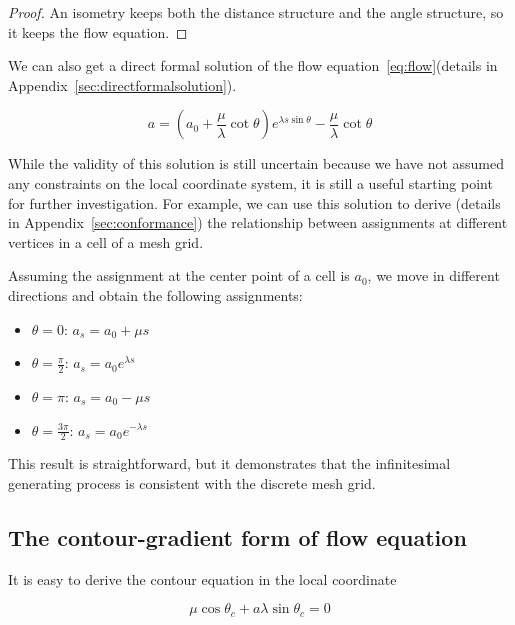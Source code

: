 \begin{proof}
  An isometry keeps both the distance structure and the angle structure, so it keeps the flow equation.
\end{proof}

We can also get a direct formal solution of the flow equation~\eqref{eq:flow}(details in Appendix~\ref{sec:directformalsolution}).

\begin{equation}
   a = (a_0 + \frac{\mu}{\lambda} \cot \theta) e^{\lambda s \sin \theta} - \frac{\mu}{\lambda} \cot \theta\label{eq:solution}
\end{equation}

While the validity of this solution is still uncertain because we have not assumed any constraints on the local coordinate system,
it is still a useful starting point for further investigation.
For example, we can use this solution to derive (details in Appendix~\ref{sec:conformance}) the relationship between assignments at different vertices in a cell of a mesh grid.

Assuming the assignment at the center point of a cell is $a_0$, we move in different directions and obtain the following assignments:

\begin{itemize}
\item $\theta = 0$: $a_s = a_0 + \mu s$
\item $\theta = \frac{\pi}{2}$: $a_s = a_0 e^{\lambda s}$
\item $\theta = \pi$: $a_s = a_0 - \mu s$
\item $\theta = \frac{3 \pi}{2}$: $a_s = a_0 e^{- \lambda s} $
\end{itemize}

This result is straightforward, but it demonstrates that the infinitesimal generating process is consistent with the discrete mesh grid.

\subsection{The contour-gradient form of flow equation}\label{subsec:the-contour-gradient-form}

It is easy to derive the contour equation in the local coordinate

\begin{equation}
    \mu \cos \theta_c + a \lambda \sin \theta_c = 0\label{eq:contour}
\end{equation}

